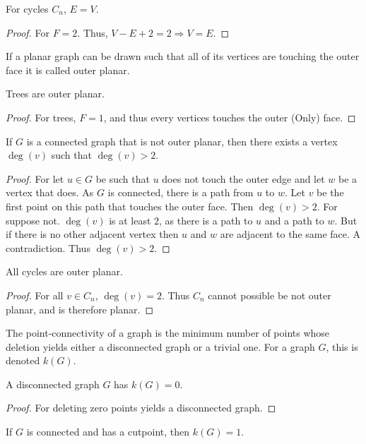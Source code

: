 \documentclass[crop=false,class=book,oneside]{standalone}
\begin{document}
\begin{corollary}
For cycles $C_n$, $E=V$.
\end{corollary}
\begin{proof}
For $F=2$. Thus, $V-E+2=2\Rightarrow V=E$.
\end{proof}
\begin{definition}
If a planar graph can be drawn such that all of its vertices are touching the outer face it is called outer planar.
\end{definition}
\begin{corollary}
Trees are outer planar.
\end{corollary}
\begin{proof}
For trees, $F=1$, and thus every vertices touches the outer (Only) face.
\end{proof}
\begin{lemma}
If $G$ is a connected graph that is not outer planar, then there exists a vertex $\deg(v)$ such that $\deg(v)>2$.
\end{lemma}
\begin{proof}
For let $u \in G$ be such that $u$ does not touch the outer edge and let $w$ be a vertex that does. As $G$ is connected, there is a path from $u$ to $w$. Let $v$ be the first point on this path that touches the outer face. Then $\deg(v)>2$. For suppose not. $\deg(v)$ is at least $2$, as there is a path to $u$ and a path to $w$. But if there is no other adjacent vertex then $u$ and $w$ are adjacent to the same face. A contradiction. Thus $\deg(v)>2$.
\end{proof}
\begin{corollary}
All cycles are outer planar.
\end{corollary}
\begin{proof}
For all $v\in C_n$, $\deg(v)=2$. Thus $C_n$ cannot possible be not outer planar, and is therefore planar.
\end{proof}
\begin{definition}
The point-connectivity of a graph is the minimum number of points whose deletion yields either a disconnected graph or a trivial one. For a graph $G$, this is denoted $k(G)$.
\end{definition}
\begin{corollary}
A disconnected graph $G$ has $k(G) = 0$.
\end{corollary}
\begin{proof}
For deleting zero points yields a disconnected graph.
\end{proof}
\begin{corollary}
If $G$ is connected and has a cutpoint, then $k(G) = 1$.
\end{corollary}
\end{document}
